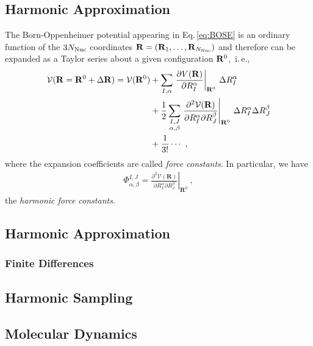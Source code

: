 \subsection{Harmonic Approximation}
The Born-Oppenheimer potential appearing in Eq.\,\eqref{eq:BOSE} is an ordinary function of the $3 N_{\rm Nuc}$ coordinates ${\bf R} = ({\bf R}_1, \ldots, {\bf R}_{N_{\rm Nuc}})$ and therefore can be expanded as a Taylor series about a given configuration ${\bf R}^0$,~i.\,e.,
\begin{align}
\begin{split}
  \mathcal V ({\bf R} = {\bf R}^0 + \Delta {\bf R})
    = \mathcal V ({\bf R}^0)
    &+ \sum_{I, \alpha} 
      \left. \frac{\partial V({\bf R})}{\partial R^\alpha_I} 
      \right\vert_{{\bf R}^0}
    \,\Delta R^\alpha_I
    \\
    &
    + \frac{1}{2}
    \sum_{\substack{I, J \\ \alpha, \beta}}
    \left.\frac{\partial^{2} \mathcal{V}(\mathbf{R})}{\partial R_{I}^{\alpha} \partial R_{J}^{\beta}}\right|_{\mathbf{R}^{0}}
    \, \Delta R_I^\alpha \Delta R_J^\beta
    \\
    &+\frac{1}{3!}\cdots ~,
\end{split}
\end{align}
where the expansion coefficients are called \emph{force constants}. In particular, we have
\begin{align}
  \Phi_{\alpha, \beta}^{I, J}
    =\left.\frac{\partial^{2} \mathcal{V}(\mathbf{R})}{\partial R_{I}^{\alpha} \partial R_{J}^{\beta}}\right|_{\mathbf{R}^{0}}~,
\end{align}
the \emph{harmonic force constants}.


\newpage

\subsection{Harmonic Approximation}
\subsubsection{Finite Differences}
\subsection{Harmonic Sampling}

\subsection{Molecular Dynamics}
